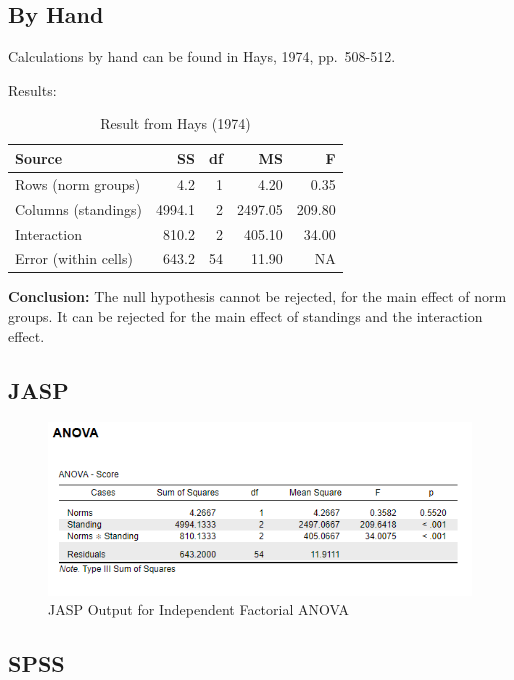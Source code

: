 \documentclass[
]{book}
\begin{document}
\hypertarget{by-hand-1}{%
\subsection{By Hand}\label{by-hand-1}}

Calculations by hand can be found in Hays, 1974, pp.~508-512.

Results:

\begin{table}

\caption{\label{tab:unnamed-chunk-45}Result from Hays (1974)}
\centering
\begin{tabular}[t]{lrrrr}
\toprule
Source & SS & df & MS & F\\
\midrule
Rows (norm groups) & 4.2 & 1 & 4.20 & 0.35\\
Columns (standings) & 4994.1 & 2 & 2497.05 & 209.80\\
Interaction & 810.2 & 2 & 405.10 & 34.00\\
Error (within cells) & 643.2 & 54 & 11.90 & NA\\
\bottomrule
\end{tabular}
\end{table}

\textbf{Conclusion:} The null hypothesis cannot be rejected, for the main effect of norm groups. It can be rejected for the main effect of standings and the interaction effect.

\hypertarget{jasp-1}{%
\subsection{JASP}\label{jasp-1}}

\begin{figure}[!h]
\includegraphics{Screenshots/Factorial Independent ANOVA/FIanovaJASP} \caption{\label{fig:FIanovaJASP}JASP Output for Independent Factorial ANOVA}\label{fig:FIanovaJASP}
\end{figure}

\hypertarget{spss-1}{%
\subsection{SPSS}\label{spss-1}}
\end{document}
